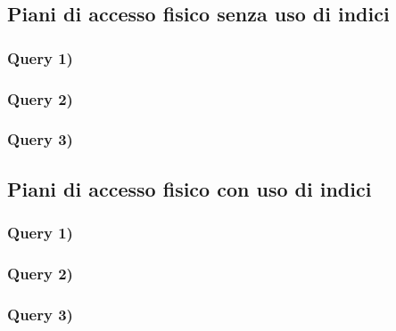 \documentclass[a4paper,12pt]{article}
\begin{document}
 \subsection{ Piani di accesso fisico senza uso di indici }

 \subsubsection{ Query 1) }

 \subsubsection{ Query 2) }

 \subsubsection{ Query 3) }

 \subsection{ Piani di accesso fisico con uso di indici }

 \subsubsection{ Query 1) }

 \subsubsection{ Query 2) }

 \subsubsection{ Query 3) }
\end{document}
